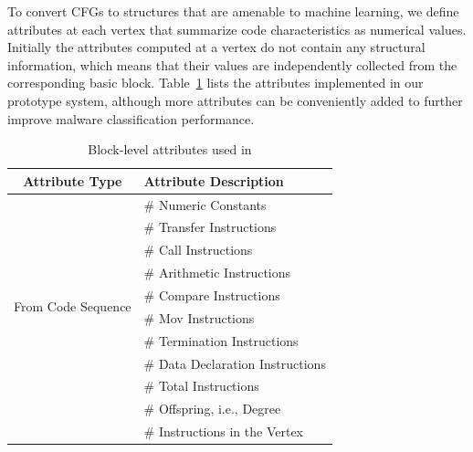 



To convert CFGs to structures that are amenable to machine learning, we define attributes at each vertex that summarize code characteristics as numerical values.
Initially the attributes computed at a vertex do not contain any structural information, which means that their values are independently collected from the corresponding basic block.
Table~\ref{tab:UsedAttributes} lists the attributes implemented in our prototype system, although more attributes can be conveniently added to further improve malware classification performance.

\begin{table}[htbp]
\caption{Block-level attributes used in \sysname}
\begin{center}
\begin{tabular}{c|l}
\hline
Attribute Type & Attribute Description \\
\hline
\multirow{10}{*}{From Code Sequence} & \# Numeric Constants \\
 & \# Transfer Instructions         \\
 & \# Call Instructions             \\
 & \# Arithmetic Instructions       \\
 & \# Compare Instructions          \\
 & \# Mov Instructions              \\
 & \# Termination Instructions      \\
 & \# Data Declaration Instructions \\
 & \# Total Instructions            \\
\hline
\multirow{2}{*}{From Vertex Structure} & \# Offspring, i.e., Degree \\
 & \# Instructions in the Vertex    \\
 \hline
\end{tabular}
\label{tab:UsedAttributes}
\end{center}
\end{table}

